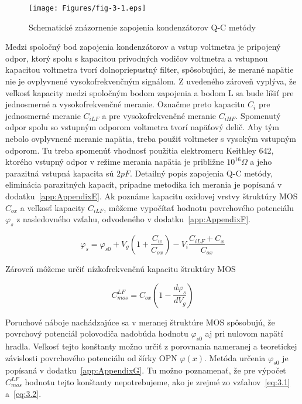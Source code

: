 \begin{figure}[h!]\centering
  \texttt{[image: Figures/fig-3-1.eps]}%
  \caption[Schematické znázornenie zapojenia kondenzátorov Q-C 
metódy]{Schematické znázornenie zapojenia kondenzátorov Q-C 
metódy}\label{fig:3.1}
\end{figure}

Medzi spoločný bod zapojenia kondenzátorov a vstup voltmetra je
pripojený odpor, ktorý spolu s kapacitou prívodných vodičov voltmetra
a vstupnou kapacitou voltmetra tvorí dolnopriepustný filter,
spôsobujúci, že merané napätie nie je ovplyvnené vysokofrekvenčným
signálom. Z uvedeného zároveň vyplýva, že veľkosť kapacity medzi
spoločným bodom zapojenia a bodom L sa bude líšiť pre jednosmerné a
vysokofrekvenčné meranie. Označme preto kapacitu $C_i$ pre jednosmerné
meranie $C_{iLF}$ a pre vysokofrekvenčné meranie $C_{iHF}$.  Spomenutý
odpor spolu so vstupným odporom voltmetra tvorí napäťový delič.  Aby
tým nebolo ovplyvnené meranie napätia, treba použiť voltmeter s
vysokým vstupným odporom.  Tu treba spomenúť vhodnosť použitia
elektromeru Keithley 642, ktorého vstupný odpor v režime merania
napätia je približne $10^{16} \Omega$ a jeho parazitná vstupná
kapacita sú $2 pF$. Detailný popis zapojenia Q-C metódy, eliminácia
parazitných kapacít, prípadne metodika ich merania je popísaná v
dodatku~\ref{app:AppendixE}. Ak poznáme kapacitu oxidovej vrstvy
štruktúry MOS $C_{ox}$ a veľkosť kapacity $C_{iLF}$, môžeme vypočítať
hodnotu povrchového potenciálu $\varphi_s$ z nasledovného vzťahu,
odvodeného v dodatku~\ref{app:AppendixF}.

\begin{equation}
  \varphi_s = \varphi_{s0} + V_g ( 1 + \frac{C_w}{C_{ox}}) - V_i \frac{C_{iLF}+C_x}{C_{ox}}
  \label{eq:3.1}
\end{equation}

Zároveň môžeme určiť nízkofrekvenčnú kapacitu štruktúry MOS

\begin{equation}
  C^{LF}_{mos} = C_{ox} (1 - \frac{d\varphi_s}{dV_g})
  \label{eq:3.2}
\end{equation}

Poruchové náboje nachádzajúce sa v meranej štruktúre MOS spôsobujú, že
povrchový potenciál polovodiča nadobúda hodnotu $\varphi_{s0}$ aj pri
nulovom napätí hradla. Veľkosť tejto konštanty možno určiť z
porovnania nameranej a teoretickej závislosti povrchového potenciálu
od šírky OPN $\varphi(x)$.  Metóda určenia $\varphi_{s0}$ je popísaná
v dodatku~\ref{app:AppendixG}. Tu možno poznamenať, že pre výpočet
$C^{LF}_{mos}$ hodnotu tejto konštanty nepotrebujeme, ako je zrejmé zo
vzťahov~\ref{eq:3.1} a~\ref{eq:3.2}.

